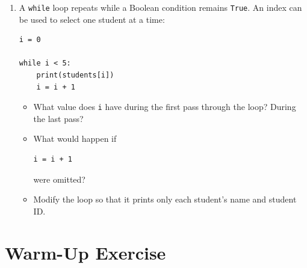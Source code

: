 \documentclass{article}
\begin{document}
\begin{enumerate}

\item A \texttt{while} loop repeats while a Boolean
condition remains \texttt{True}.  An index can be used
to select one student at a time:

\begin{verbatim}
i = 0

while i < 5:
    print(students[i])
    i = i + 1
\end{verbatim}

\begin{itemize}

\item What value does \texttt{i} have during the first
pass through the loop?  During the last pass?

\item What would happen if

\begin{verbatim}
i = i + 1
\end{verbatim}

were omitted?

\item Modify the loop so that it prints only each
student's name and student ID.

\end{itemize}

\end{enumerate}


\section{Warm-Up Exercise}
\end{document}
